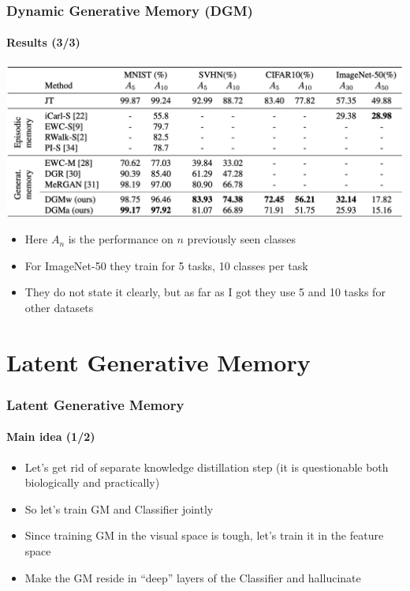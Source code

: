 \documentclass[10pt]{beamer}
\begin{document}
\begin{frame}
    \frametitle{Dynamic Generative Memory (DGM)}
    \framesubtitle{Results (3/3)}
    
    \centering
    \includegraphics[width=\textwidth]{images/dgm-results}
    
    \begin{itemize}
        \item Here $A_n$ is the performance on $n$ previously seen classes
        \item For ImageNet-50 they train for 5 tasks, 10 classes per task
        \item They do not state it clearly, but as far as I got they use 5 and 10 tasks for other datasets
    \end{itemize}
\end{frame}

\section{Latent Generative Memory}
\begin{frame}
    \frametitle{Latent Generative Memory}
    \framesubtitle{Main idea (1/2)}
    
    \begin{itemize}
        \item Let's get rid of separate knowledge distillation step (it is questionable both biologically and practically)
        \item So let's train GM and Classifier jointly
        \item Since training GM in the visual space is tough, let's train it in the feature space
        \item Make the GM reside in ``deep'' layers of the Classifier and hallucinate
    \end{itemize}
\end{frame}
\end{document}
